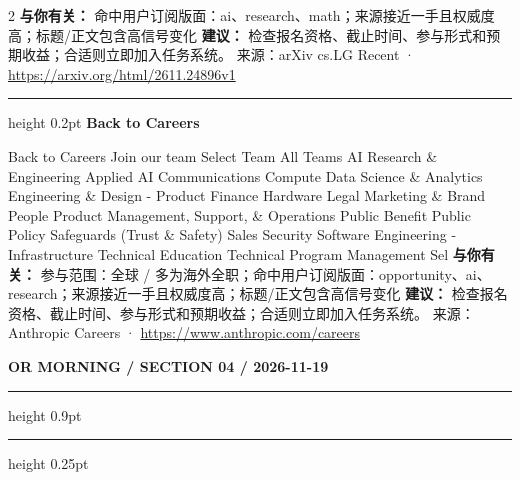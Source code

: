 \documentclass[10.5pt]{ctexart}
\begin{document}
\begin{multicols}{2}
\textbf{与你有关：} 命中用户订阅版面：ai、research、math；来源接近一手且权威度高；标题/正文包含高信号变化
\textbf{建议：} 检查报名资格、截止时间、参与形式和预期收益；合适则立即加入任务系统。
{\footnotesize\color{ormuted} 来源：arXiv cs.LG Recent · \url{https://arxiv.org/html/2611.24896v1}}
\vspace{2mm}
\hrule height 0.2pt
\vspace{2mm}
{\large\bfseries Back to Careers}\par
Back to Careers Join our team Select Team All Teams AI Research \& Engineering Applied AI Communications Compute Data Science \& Analytics Engineering \& Design - Product Finance Hardware Legal Marketing \& Brand People Product Management, Support, \& Operations Public Benefit Public Policy Safeguards (Trust \& Safety) Sales Security Software Engineering - Infrastructure Technical Education Technical Program Management Sel
\textbf{与你有关：} 参与范围：全球 / 多为海外全职；命中用户订阅版面：opportunity、ai、research；来源接近一手且权威度高；标题/正文包含高信号变化
\textbf{建议：} 检查报名资格、截止时间、参与形式和预期收益；合适则立即加入任务系统。
{\footnotesize\color{ormuted} 来源：Anthropic Careers · \url{https://www.anthropic.com/careers}}
\end{multicols}
\newpage
{\small\bfseries OR MORNING / SECTION 04 / 2026-11-19}
\vspace{2mm}
\hrule height 0.9pt
\vspace{1.5mm}
\hrule height 0.25pt
\vspace{4mm}
\end{document}
